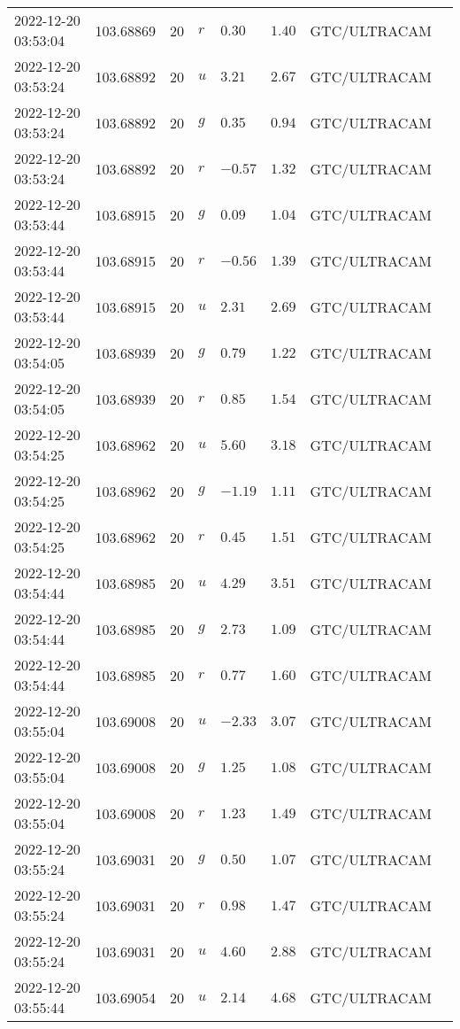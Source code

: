\documentclass{nature_plusfigure}
\begin{document}
\begin{supplement}
\begin{center}
\begin{longtable}{llllllll}
2022-12-20 03:53:04 & 103.68869 & 20 & $r$ & $0.30$ & $1.40$ & GTC/ULTRACAM &  \\ 
2022-12-20 03:53:24 & 103.68892 & 20 & $u$ & $3.21$ & $2.67$ & GTC/ULTRACAM &  \\ 
2022-12-20 03:53:24 & 103.68892 & 20 & $g$ & $0.35$ & $0.94$ & GTC/ULTRACAM &  \\ 
2022-12-20 03:53:24 & 103.68892 & 20 & $r$ & $-0.57$ & $1.32$ & GTC/ULTRACAM &  \\ 
2022-12-20 03:53:44 & 103.68915 & 20 & $g$ & $0.09$ & $1.04$ & GTC/ULTRACAM &  \\ 
2022-12-20 03:53:44 & 103.68915 & 20 & $r$ & $-0.56$ & $1.39$ & GTC/ULTRACAM &  \\ 
2022-12-20 03:53:44 & 103.68915 & 20 & $u$ & $2.31$ & $2.69$ & GTC/ULTRACAM &  \\ 
2022-12-20 03:54:05 & 103.68939 & 20 & $g$ & $0.79$ & $1.22$ & GTC/ULTRACAM &  \\ 
2022-12-20 03:54:05 & 103.68939 & 20 & $r$ & $0.85$ & $1.54$ & GTC/ULTRACAM &  \\ 
2022-12-20 03:54:25 & 103.68962 & 20 & $u$ & $5.60$ & $3.18$ & GTC/ULTRACAM &  \\ 
2022-12-20 03:54:25 & 103.68962 & 20 & $g$ & $-1.19$ & $1.11$ & GTC/ULTRACAM &  \\ 
2022-12-20 03:54:25 & 103.68962 & 20 & $r$ & $0.45$ & $1.51$ & GTC/ULTRACAM &  \\ 
2022-12-20 03:54:44 & 103.68985 & 20 & $u$ & $4.29$ & $3.51$ & GTC/ULTRACAM &  \\ 
2022-12-20 03:54:44 & 103.68985 & 20 & $g$ & $2.73$ & $1.09$ & GTC/ULTRACAM &  \\ 
2022-12-20 03:54:44 & 103.68985 & 20 & $r$ & $0.77$ & $1.60$ & GTC/ULTRACAM &  \\ 
2022-12-20 03:55:04 & 103.69008 & 20 & $u$ & $-2.33$ & $3.07$ & GTC/ULTRACAM &  \\ 
2022-12-20 03:55:04 & 103.69008 & 20 & $g$ & $1.25$ & $1.08$ & GTC/ULTRACAM &  \\ 
2022-12-20 03:55:04 & 103.69008 & 20 & $r$ & $1.23$ & $1.49$ & GTC/ULTRACAM &  \\ 
2022-12-20 03:55:24 & 103.69031 & 20 & $g$ & $0.50$ & $1.07$ & GTC/ULTRACAM &  \\ 
2022-12-20 03:55:24 & 103.69031 & 20 & $r$ & $0.98$ & $1.47$ & GTC/ULTRACAM &  \\ 
2022-12-20 03:55:24 & 103.69031 & 20 & $u$ & $4.60$ & $2.88$ & GTC/ULTRACAM &  \\ 
2022-12-20 03:55:44 & 103.69054 & 20 & $u$ & $2.14$ & $4.68$ & GTC/ULTRACAM &  \\ 

\end{longtable}
\end{center}
\end{supplement}
\end{document}

